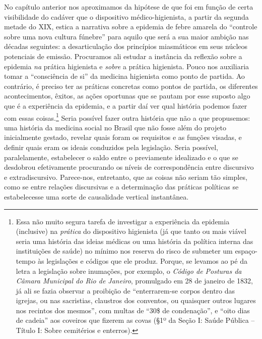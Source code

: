 No capítulo anterior nos aproximamos da hipótese de que foi em função de
certa visibilidade do cadáver que o dispositivo médico-higienista, a
partir da segunda metade do XIX, estica a narrativa sobre a epidemia de
febre amarela do ``controle sobre uma nova cultura fúnebre'' para aquilo
que será a sua maior ambição nas décadas seguintes: a desarticulação dos
princípios miasmáticos em seus núcleos potenciais de emissão. Procuramos
ali estudar a instância da reflexão sobre a epidemia \emph{na} prática
higienista e \emph{sobre} a prática higienista. Pouco nos auxiliaria
tomar a ``consciência de si'' da medicina higienista como ponto de
partida. Ao contrário, é preciso ter as práticas concretas como pontos
de partida, os diferentes acontecimentos, êxitos, as ações oportunas que
se pautam por esse suposto algo que é a experiência da epidemia, e a
partir daí ver qual história podemos fazer com essas coisas.\footnote{Essa
  não muito segura tarefa de investigar a experiência da epidemia
  (inclusive) na \emph{prática} do dispositivo higienista (já que tanto
  ou mais viável seria uma história das ideias médicas ou uma história
  da política interna das instituições de saúde) no mínimo nos reserva
  do risco de submeter um espaço-tempo às legislações e códigos que ele
  produz. Porque, se levamos ao pé da letra a legislação sobre
  inumações, por exemplo, o \emph{Código de Posturas da Câmara Municipal
  do Rio de Janeiro}, promulgado em 28 de janeiro de 1832, já ali se
  fazia observar a proibição de ``enterrarem-se corpos dentro das
  igrejas, ou nas sacristias, claustros dos conventos, ou quaisquer
  outros lugares nos recintos dos mesmos'', com multas de ``30\$ de
  condenação'', e ``oito dias de cadeia'' aos coveiros que fizerem as
  covas (§1º da Seção I: Saúde Pública -- Título I: Sobre cemitérios e
  enterros).} Seria possível fazer outra história que não a que
propusemos: uma história da medicina social no Brasil que não fosse além
do projeto inicialmente gestado, revelar quais foram os requisitos e as
funções visadas, e definir quais eram os ideais conduzidos pela
legislação. Seria possível, paralelamente, estabelecer o saldo entre o
previamente idealizado e o que se desdobrou efetivamente procurando os
níveis de correspondência entre discursivo e extradiscursivo.
Parece-nos, entretanto, que as coisas não seriam tão simples, como se
entre relações discursivas e a determinação das práticas políticas se
estabelecesse uma sorte de causalidade vertical instantânea.

